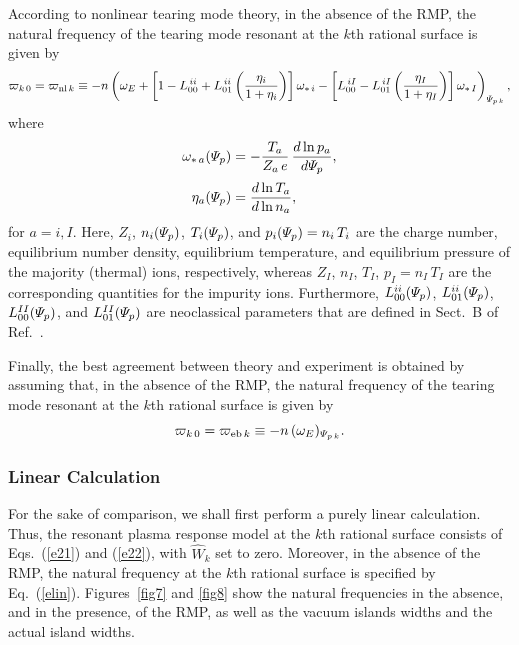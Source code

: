 \documentclass[12pt,prb,aps]{revtex4-1}
\begin{document}
According to nonlinear tearing mode theory, in the absence of the RMP, 
the natural frequency of the tearing mode resonant at the $k$th rational surface is given by\,\cite{rftor}
\begin{equation}
\varpi_{k\,0} = \varpi_{{\rm nl}\,k}\equiv  -n\left(\omega_E +\left[1-L_{00}^{\,ii}+L_{01}^{\,ii}\left(\frac{\eta_i}{1+\eta_i}\right)\right]
\omega_{\ast\,i}
-\left[L_{00}^{\,iI}- L_{01}^{\,iI}\left(\frac{\eta_I}{1+\eta_I}\right)\right]\omega_{\ast\,I}\right)_{{\mit\Psi}_{p\,k}},
\end{equation}
where
\begin{align}
\omega_{\ast\,a}({\mit\Psi}_p) &=-\frac{T_a}{Z_a\,e}\,\frac{d\ln p_a}{d{\mit\Psi}_p},\\[0.5ex]
\eta_a({\mit\Psi}_p)&=\frac{d\ln T_a}{d\ln n_a},
\end{align}
for $a=i, I$. 
Here, $Z_i$, $n_i({\mit\Psi}_p)$, $T_i({\mit\Psi}_p)$, and $p_i({\mit\Psi}_p)=n_i\,T_i$   are the charge number, 
equilibrium number density, 
equilibrium temperature, and equilibrium pressure
of the majority (thermal) ions, respectively,
whereas  $Z_I$, $n_I$, $T_I$, $p_I = n_I\,T_I$
are the corresponding quantities for the impurity ions.  
Furthermore, $L_{00}^{ii}({\mit\Psi}_p)$, $L_{01}^{ii}({\mit\Psi}_p)$,  $L_{00}^{II}({\mit\Psi}_p)$, and $L_{01}^{II}({\mit\Psi}_p)$ are neoclassical parameters that are defined
in Sect.~B of Ref.~. 

Finally, the best agreement between theory and experiment is obtained by assuming that, in the absence of the RMP, the 
 natural frequency of the tearing mode resonant at the $k$th rational surface is given by\,\cite{rftor1}
\begin{equation}\label{eeb}
\varpi_{k\,0} = \varpi_{{\rm eb}\,k}\equiv -n\,(\omega_E)_{{\mit\Psi}_{p\,k}}.
\end{equation}

\subsubsection{Linear Calculation}
For the sake of comparison, we shall first perform a purely linear calculation. Thus, the
resonant plasma response model at the $k$th rational surface consists of Eqs.~(\ref{e21}) and (\ref{e22}), with
$\hat{W}_k$ set to zero. Moreover, in the absence of the RMP, the natural frequency at the $k$th rational surface is specified by Eq.~(\ref{elin}).
Figures~\ref{fig7} and \ref{fig8} show the natural frequencies in the absence, and in the presence, of the RMP, as well as the vacuum
islands widths and the actual island widths. 
\end{document}
